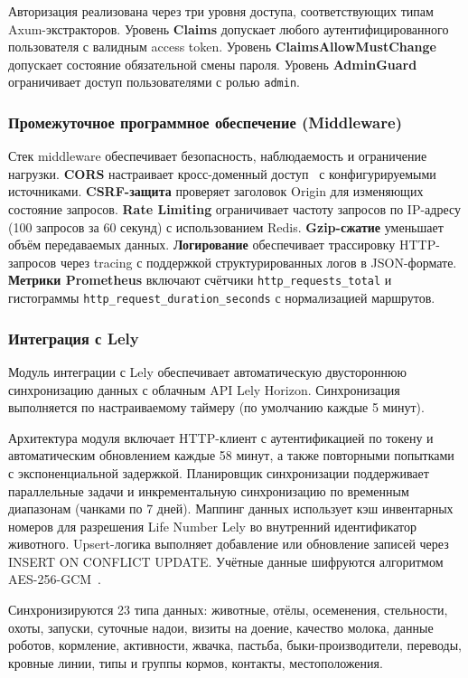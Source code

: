 Авторизация реализована через три уровня доступа, соответствующих типам Axum-экстракторов. Уровень \textbf{Claims} допускает любого аутентифицированного пользователя с валидным access token. Уровень \textbf{ClaimsAllowMustChange} допускает состояние обязательной смены пароля. Уровень \textbf{AdminGuard} ограничивает доступ пользователями с ролью \texttt{admin}.

\subsubsection{Промежуточное программное обеспечение (Middleware)}

Стек middleware обеспечивает безопасность, наблюдаемость и ограничение нагрузки. \textbf{CORS} настраивает кросс-доменный доступ~\cite{CORS} с конфигурируемыми источниками. \textbf{CSRF-защита} проверяет заголовок Origin для изменяющих состояние запросов. \textbf{Rate Limiting} ограничивает частоту запросов по IP-адресу (100 запросов за 60 секунд) с использованием Redis. \textbf{Gzip-сжатие} уменьшает объём передаваемых данных. \textbf{Логирование} обеспечивает трассировку HTTP-запросов через tracing с поддержкой структурированных логов в JSON-формате. \textbf{Метрики Prometheus} включают счётчики \texttt{http\_requests\_total} и гистограммы \texttt{http\_request\_duration\_seconds} с нормализацией маршрутов.

\subsubsection{Интеграция с Lely}

Модуль интеграции с Lely обеспечивает автоматическую двустороннюю синхронизацию данных с облачным API Lely Horizon. Синхронизация выполняется по настраиваемому таймеру (по умолчанию каждые 5 минут).

Архитектура модуля включает HTTP-клиент с аутентификацией по токену и автоматическим обновлением каждые 58 минут, а также повторными попытками с экспоненциальной задержкой. Планировщик синхронизации поддерживает параллельные задачи и инкрементальную синхронизацию по временным диапазонам (чанками по 7 дней). Маппинг данных использует кэш инвентарных номеров для разрешения Life Number Lely во внутренний идентификатор животного. Upsert-логика выполняет добавление или обновление записей через INSERT ON CONFLICT UPDATE. Учётные данные шифруются алгоритмом AES-256-GCM~\cite{AES-GCM}.

Синхронизируются 23 типа данных: животные, отёлы, осеменения, стельности, охоты, запуски, суточные надои, визиты на доение, качество молока, данные роботов, кормление, активности, жвачка, пастьба, быки-производители, переводы, кровные линии, типы и группы кормов, контакты, местоположения.
